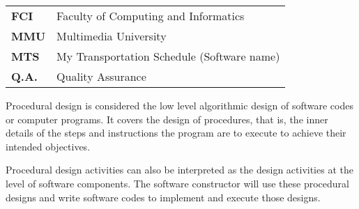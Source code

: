 \documentclass[12pt, oneside]{Thesis}
\begin{document}

\pagebreak
{} 


\begin{table}[ht]
\begin{tabular}{p{2.5cm}p{11.0cm}}

\textbf{FCI} & Faculty of Computing and Informatics\\
\textbf{MMU} & Multimedia University\\
\textbf{MTS} & My Transportation Schedule (Software name)\\
\textbf{Q.A.} & Quality Assurance\\
\end{tabular}
\end{table}


\pagebreak
{} 

Procedural design is considered the low level algorithmic design of software codes or computer programs. It covers the design of procedures, that is, the inner details of the steps and instructions the program are to execute to achieve their intended objectives. 

Procedural design activities can also be interpreted as the design activities at the level of software components. The software constructor will use these procedural designs and write software codes to implement and execute those designs. 



\clearpage %
\pagebreak

\mainmatter 
\end{document}
